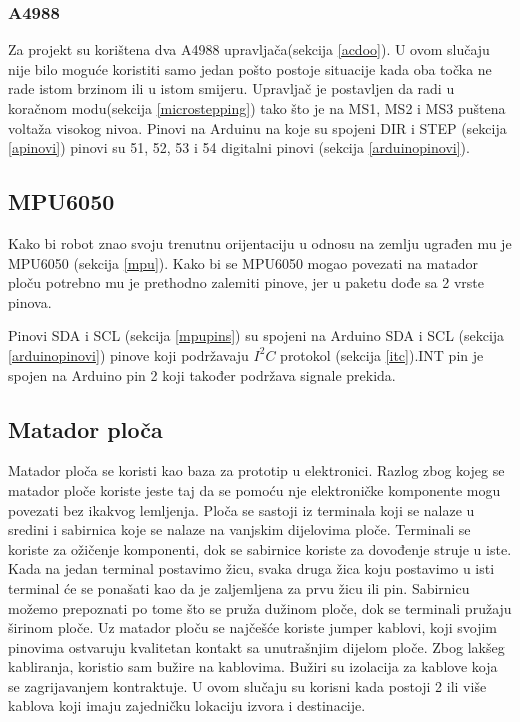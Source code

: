 \documentclass[../Document.tex]{subfiles}
\begin{document}
\subsubsection{A4988}
Za projekt su korištena dva A4988 upravljača(sekcija \ref{acdoo}). U ovom slučaju nije bilo moguće koristiti samo jedan pošto postoje situacije kada oba točka ne rade istom brzinom ili u istom smijeru. Upravljač je postavljen da radi u  koračnom modu(sekcija \ref{microstepping}) tako što je na MS1, MS2 i MS3 puštena voltaža visokog nivoa. Pinovi na Arduinu na koje su spojeni DIR i STEP (sekcija \ref{apinovi}) pinovi su 51, 52, 53 i 54 digitalni pinovi (sekcija \ref{arduinopinovi}).

\subsection{MPU6050}
Kako bi robot znao svoju trenutnu orijentaciju u odnosu na zemlju ugrađen mu je MPU6050 (sekcija \ref{mpu}). Kako bi se MPU6050 mogao povezati na matador ploču potrebno mu je prethodno zalemiti pinove, jer u paketu dođe sa 2 vrste pinova.


\noindent Pinovi SDA i SCL (sekcija \ref{mpupins}) su spojeni na Arduino SDA i SCL (sekcija \ref{arduinopinovi}) pinove koji podržavaju {$I^2C$} protokol (sekcija \ref{itc}).INT pin je spojen na Arduino pin 2 koji također podržava signale prekida.

\subsection{Matador ploča}
Matador ploča se koristi kao baza za prototip u elektronici. Razlog zbog kojeg se matador ploče koriste jeste taj da se pomoću nje elektroničke komponente mogu povezati bez ikakvog lemljenja. Ploča se sastoji iz terminala koji se nalaze u sredini i sabirnica koje se nalaze na vanjskim dijelovima ploče. Terminali se koriste za ožičenje komponenti, dok se sabirnice koriste za dovođenje struje u iste. Kada na jedan terminal postavimo žicu, svaka druga žica koju postavimo u isti terminal će se ponašati kao da je zaljemljena za prvu žicu ili pin. Sabirnicu možemo prepoznati po tome što se pruža dužinom ploče, dok se terminali pružaju širinom ploče. Uz matador ploču se najčešće koriste jumper kablovi, koji svojim pinovima ostvaruju kvalitetan kontakt sa unutrašnjim dijelom ploče. Zbog lakšeg kabliranja, koristio sam bužire na kablovima. Bužiri su izolacija za kablove koja se zagrijavanjem kontraktuje. U ovom slučaju su korisni kada postoji 2 ili više kablova koji imaju zajedničku lokaciju izvora i destinacije.
\end{document}
